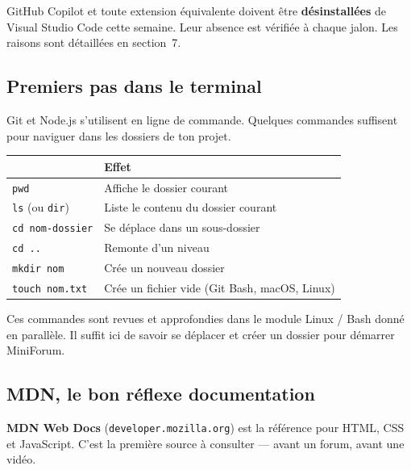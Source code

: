 \documentclass[a4paper,11pt]{article}
\newcommand{\hdr}[1]{\multicolumn{1}{l}{\color{white}\bfseries #1}}
\renewcommand{\arraystretch}{1.3}
\begin{document}
\begin{tcolorbox}[interdit, title={À désinstaller : les extensions d'assistance IA}]
GitHub Copilot et toute extension équivalente doivent être \textbf{désinstallées} de Visual Studio Code cette semaine. Leur absence est vérifiée à chaque jalon. Les raisons sont détaillées en section~7.
\end{tcolorbox}

\subsection{Premiers pas dans le terminal}

Git et Node.js s'utilisent en ligne de commande. Quelques commandes suffisent pour naviguer dans les dossiers de ton projet.

\begin{center}
\renewcommand{\arraystretch}{1.0}
\begin{tabularx}{\linewidth}{p{4cm}X}
  \toprule
  \rowcolor{uniNavy}
  \hdr{Commande} &  \hdr{Effet} \\
  \midrule
  \rowcolor{uniPaper}
  \texttt{pwd}            & Affiche le dossier courant \\
  \texttt{ls} (ou \texttt{dir}) & Liste le contenu du dossier courant \\
  \rowcolor{uniPaper}
  \texttt{cd nom-dossier} & Se déplace dans un sous-dossier \\
  \texttt{cd ..}          & Remonte d'un niveau \\
  \rowcolor{uniPaper}
  \texttt{mkdir nom}      & Crée un nouveau dossier \\
  \texttt{touch nom.txt}  & Crée un fichier vide (Git Bash, macOS, Linux) \\
  \bottomrule
\end{tabularx}
\end{center}

\begin{tcolorbox}[astuce, title={Lien avec le cours Linux / Bash}]
Ces commandes sont revues et approfondies dans le module Linux / Bash donné en parallèle. Il suffit ici de savoir se déplacer et créer un dossier pour démarrer MiniForum.
\end{tcolorbox}

\subsection{MDN, le bon réflexe documentation}

\textbf{MDN Web Docs} (\texttt{developer.mozilla.org}) est la référence pour HTML, CSS et JavaScript. C'est la première source à consulter --- avant un forum, avant une vidéo.
\end{document}
